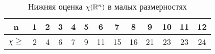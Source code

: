\begin{table}[h]\centering
\caption{Нижняя оценка $\chi(\mathbb R^n)$ в малых размерностях}
\begin{tabular}{|c|c|c|c|c|c|c|c|c|c|c|c|c|}

\hline
n &           1 & 2 & 3 & 4 & 5 & 6 &   7 & 8 & 9 & 10   & 11 & 12 \\ \hline
$\chi \geq$ & 2 & 4 & 6 & 7 & 9 & 11 & 15 & 16 & 21 & 23 & 23 & 24 \\ \hline
\end{tabular}
\end{table}
